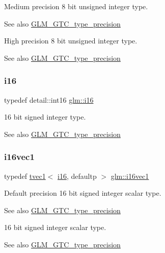 Medium precision 8 bit unsigned integer type. \begin{DoxySeeAlso}{See also}
\hyperlink{group__gtc__type__precision}{G\+L\+M\+\_\+\+G\+T\+C\+\_\+type\+\_\+precision}
\end{DoxySeeAlso}
High precision 8 bit unsigned integer type. \begin{DoxySeeAlso}{See also}
\hyperlink{group__gtc__type__precision}{G\+L\+M\+\_\+\+G\+T\+C\+\_\+type\+\_\+precision} 
\end{DoxySeeAlso}
\mbox{\label{group__gtc__type__precision_ga35e5542ca05b29cc256fdafb8503d1fd}} 
\subsubsection{\texorpdfstring{i16}{i16}}
{\footnotesize\ttfamily typedef detail\+::int16 \hyperlink{group__gtc__type__precision_ga35e5542ca05b29cc256fdafb8503d1fd}{glm\+::i16}}

16 bit signed integer type. \begin{DoxySeeAlso}{See also}
\hyperlink{group__gtc__type__precision}{G\+L\+M\+\_\+\+G\+T\+C\+\_\+type\+\_\+precision} 
\end{DoxySeeAlso}
\mbox{\label{group__gtc__type__precision_gacec84a02174e44363dd105769fb22473}} 
\subsubsection{\texorpdfstring{i16vec1}{i16vec1}}
{\footnotesize\ttfamily typedef \hyperlink{structglm_1_1tvec1}{tvec1}$<$ \hyperlink{group__gtc__type__precision_ga35e5542ca05b29cc256fdafb8503d1fd}{i16}, defaultp $>$ \hyperlink{group__gtc__type__precision_gacec84a02174e44363dd105769fb22473}{glm\+::i16vec1}}

Default precision 16 bit signed integer scalar type. \begin{DoxySeeAlso}{See also}
\hyperlink{group__gtc__type__precision}{G\+L\+M\+\_\+\+G\+T\+C\+\_\+type\+\_\+precision}
\end{DoxySeeAlso}
16 bit signed integer scalar type. \begin{DoxySeeAlso}{See also}
\hyperlink{group__gtc__type__precision}{G\+L\+M\+\_\+\+G\+T\+C\+\_\+type\+\_\+precision} 
\end{DoxySeeAlso}
\mbox{\label{group__gtc__type__precision_ga37af364ff13fb791571dd324dfd3ca89}} 

